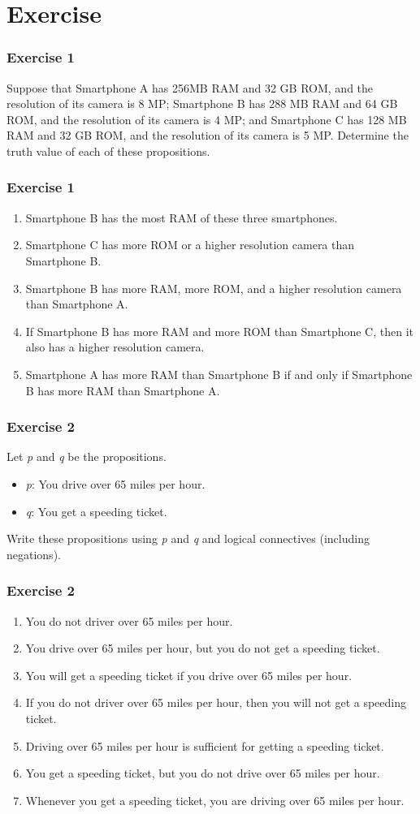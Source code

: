 \documentclass{beamer}
\begin{document}
\section{Exercise}
\begin{frame}
    \frametitle{Exercise 1}
    Suppose that Smartphone A has 256MB RAM and 32 GB ROM, and the resolution of its camera is 8 MP; Smartphone B has 288 MB RAM and 64 GB ROM, and the resolution of its camera is 4 MP; and Smartphone C has 128 MB RAM and 32 GB ROM, and the resolution of its camera is 5 MP. Determine the truth value of each of these propositions.
\end{frame}
\begin{frame}
    \frametitle{Exercise 1}
    \begin{enumerate}
        \item Smartphone B has the most RAM of these three smartphones.
        \item Smartphone C has more ROM or a higher resolution camera than Smartphone B.
        \item Smartphone B has more RAM, more ROM, and a higher resolution camera than Smartphone A.
        \item If Smartphone B has more RAM and more ROM than Smartphone C, then it also has a higher resolution camera.
        \item Smartphone A has more RAM than Smartphone B if and only if Smartphone B has more RAM than Smartphone A.
    \end{enumerate}
\end{frame}
\begin{frame}
    \frametitle{Exercise 2}
    Let \textit{p} and \textit{q} be the propositions.
    \begin{itemize}
        \item \textit{p}: You drive over 65 miles per hour.
        \item \textit{q}: You get a speeding ticket.
        \end{itemize}

        Write these propositions using \textit{p} and \textit{q} and logical connectives (including negations).
\end{frame}
\begin{frame}
    \frametitle{Exercise 2}
    \begin{enumerate}
        \item You do not driver over 65 miles per hour.
        \item You drive over 65 miles per hour, but you do not get a speeding ticket.
        \item You will get a speeding ticket if you drive over 65 miles per hour.
        \item If you do not driver over 65 miles per hour, then you will not get a speeding ticket.
        \item Driving over 65 miles per hour is sufficient for getting a speeding ticket.
        \item You get a speeding ticket, but you do not drive over 65 miles per hour.
        \item Whenever you get a speeding ticket, you are driving over 65 miles per hour.
    \end{enumerate}
\end{frame}
\end{document}
